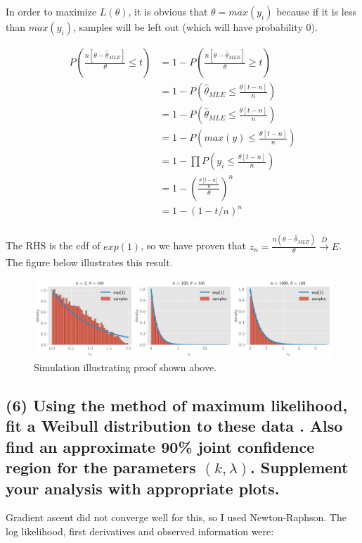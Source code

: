 \documentclass[11pt]{article}
\begin{document}
In order to maximize $L(\theta)$, it is obvious that $\theta = max(y_i)$ because if it is less than $ max(y_i)$, samples will be left out (which  will have probability 0).

\begin{align*}
    P\left(\frac{n[\theta-\hat{\theta}_{MLE}] }{\theta} \leq t\right) &= 1 -  P\left(\frac{n[\theta-\hat{\theta}_{MLE}] }{\theta}  \geq t\right)\\
    &= 1 -  P\left(\hat{\theta}_{MLE}  \leq \frac{\theta[t-n]}{n} \right)\\
     &= 1 -  P\left(\hat{\theta}_{MLE}  \leq \frac{\theta[t-n]}{n} \right)\\
      &= 1 -  P\left(max(y)  \leq \frac{\theta[t-n]}{n} \right)\\
       &= 1 -  \prod P\left(y_i  \leq \frac{\theta[t-n]}{n} \right)\\
        &= 1 -  \left( \frac{\frac{\theta[t-n]}{n}}{\theta} \right)^n\\
          &= 1 -  (1-t/n)^n\\
\end{align*}
 
 The RHS is the cdf of $exp(1)$, so we have proven that  $ z_n = \frac{n(\theta-\hat{\theta}_{MLE})}{\theta} \xrightarrow[]{D} E$. The figure below illustrates this result.


\begin{figure}[!h]
    \centering
    \includegraphics[scale=.4]{homework_2/figures/uniform.png}
    \caption{Simulation illustrating proof shown above.}
    \label{fig:my_label}
\end{figure}

\subsection*{(6)  Using the method of maximum likelihood, fit a Weibull distribution to these data . Also find an approximate 90\% joint confidence region for the parameters $(k, \lambda)$. Supplement your analysis with appropriate plots.}

Gradient ascent did not converge well for this, so I used Newton-Raphson. The log likelihood, first derivatives and observed information were:
\end{document}
